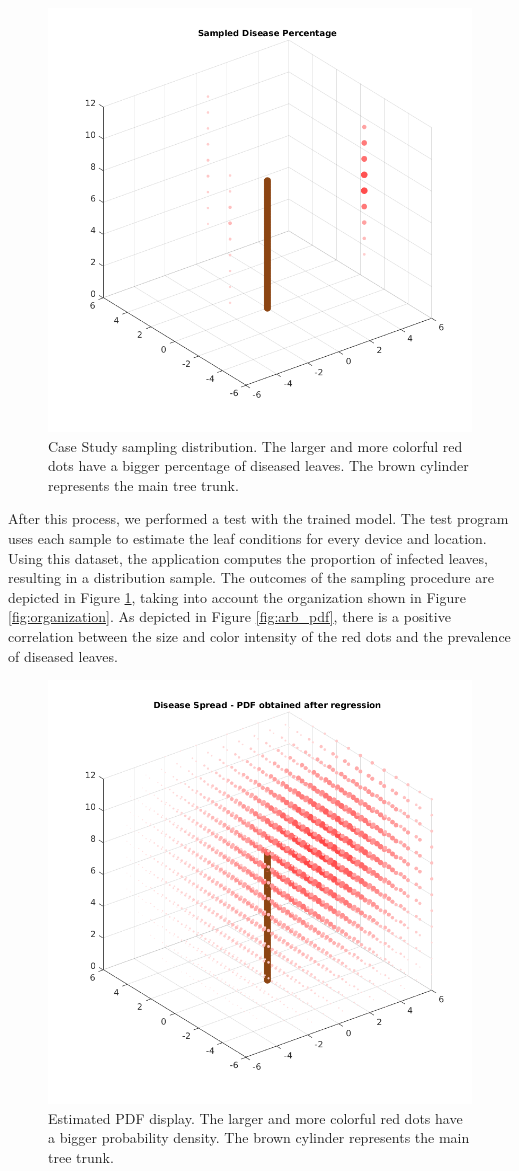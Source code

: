 \begin{figure}[h!]
    \centering
    \includegraphics[width = .6\linewidth]{Figures/sampled-disease.png}
    \caption{Case Study sampling distribution. {\color{black}The larger and more colorful red dots have a bigger percentage of diseased leaves. The brown cylinder represents the main tree trunk.}}
    \label{fig:sampling-result}
\end{figure}

After this process, we performed a test with the trained model. The test program uses each sample to estimate the leaf conditions for every device and location. Using this dataset, the application computes the proportion of infected leaves, resulting in a distribution sample. The outcomes of the sampling procedure are depicted in Figure \ref{fig:sampling-result}, taking into account the organization shown in Figure \ref{fig:organization}. As depicted in Figure \ref{fig:arb_pdf}, there is a positive correlation between the size and color intensity of the red dots and the prevalence of diseased leaves.

\begin{figure}[h!]
    \centering
    \includegraphics[width = .6\linewidth]{Figures/regression-pdf.png}
    \caption{Estimated PDF display. The larger and more colorful red dots have a bigger probability density. {\color{black}The brown cylinder represents the main tree trunk.}}
    \label{fig:comparison-pdf}
\end{figure}


